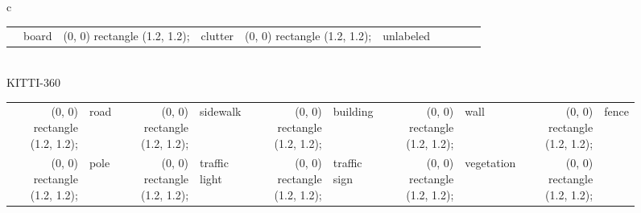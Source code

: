 \begin{figure*}[!b]
\begin{tabular}{c}
\begin{tabular}{@{}rlrlrlrlrl@{}}
            & \small{board}
            &
            \definecolor{tempcolor}{rgb}{0.91,0.91,.90}
            \tikz \fill[fill=tempcolor, scale=0.3, draw=black] (0, 0) rectangle (1.2, 1.2);
            & \small{clutter} 
            &
            \definecolor{tempcolor}{rgb}{0.,0.,0}
            \tikz \fill[fill=tempcolor, scale=0.3, draw=black] (0, 0) rectangle (1.2, 1.2);
            & \small{unlabeled} 
        \end{tabular}
        \\
         \toprule
        \large{KITTI-360}
        \\\midrule
        \begin{tabular}{rlrlrlrlrl}
            \definecolor{tempcolor}{rgb}{0.50, 0.25, 0.50}
            \tikz \fill[fill=tempcolor, scale=0.3, draw=black] (0, 0) rectangle (1.2, 1.2);
            & \small{road} 
            &
            \definecolor{tempcolor}{rgb}{0.95, 0.13, 0.90}
            \tikz \fill[fill=tempcolor, scale=0.3, draw=black] (0, 0) rectangle (1.2, 1.2);
            & \small{sidewalk} 
            &
            \definecolor{tempcolor}{rgb}{0.27, 0.27, 0.27}
            \tikz \fill[fill=tempcolor, scale=0.3, draw=black] (0, 0) rectangle (1.2, 1.2);
            & \small{building} 
            &
            \definecolor{tempcolor}{rgb}{0.4 , 0.4 , 0.61}
            \tikz \fill[fill=tempcolor, scale=0.3, draw=black] (0, 0) rectangle (1.2, 1.2);
            & \small{wall} 
            &
            \definecolor{tempcolor}{rgb}{0.74, 0.6 , 0.6 }
            \tikz \fill[fill=tempcolor, scale=0.3, draw=black] (0, 0) rectangle (1.2, 1.2);
            & \small{fence} 
            \\
            \definecolor{tempcolor}{rgb}{0.6 , 0.6 , 0.6 }
            \tikz \fill[fill=tempcolor, scale=0.3, draw=black] (0, 0) rectangle (1.2, 1.2);
            & \small{pole} 
            &
            \definecolor{tempcolor}{rgb}{0.98, 0.66, 0.11}
            \tikz \fill[fill=tempcolor, scale=0.3, draw=black] (0, 0) rectangle (1.2, 1.2);
            & \small{traffic light} 
            &
            \definecolor{tempcolor}{rgb}{0.86, 0.86, 0.  }
            \tikz \fill[fill=tempcolor, scale=0.3, draw=black] (0, 0) rectangle (1.2, 1.2);
            & \small{traffic sign} 
            &
            \definecolor{tempcolor}{rgb}{0.41, 0.55, 0.13}
            \tikz \fill[fill=tempcolor, scale=0.3, draw=black] (0, 0) rectangle (1.2, 1.2);
            & \small{vegetation} 
            &
            \definecolor{tempcolor}{rgb}{0.59, 0.98, 0.59}
            \tikz \fill[fill=tempcolor, scale=0.3, draw=black] (0, 0) rectangle (1.2, 1.2);

\end{tabular}
\end{tabular}
\end{figure*}
